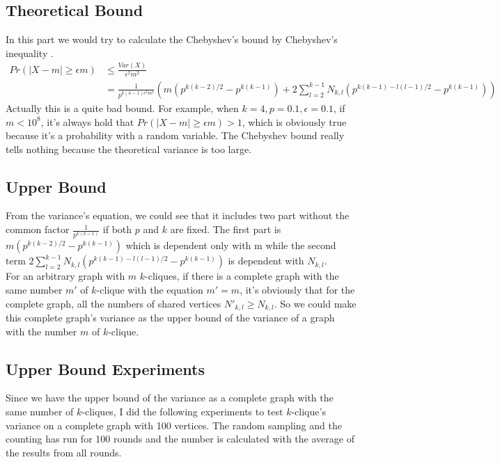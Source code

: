 \subsection{Theoretical Bound}
In this part we would try to calculate the Chebyshev's bound by Chebyshev's inequality\cite{cheby} \cite {cheby_wki}. \\
\[
        \begin{split}
Pr(|X - m| \geq \epsilon m) &\leq \frac{Var(X)}{\epsilon^2 m^2}  \\
&= \frac{1}{p^{k(k-1) \epsilon^2 m^2}}(m(p^{k(k-2)/2} - p^{k(k-1)}) + 2\sum_{l=2}^{k-1} N_{k,l}(p^{k(k-1)-l(l-1)/2} - p^{k(k-1)}))
        \end{split}
\]
Actually this is a quite bad bound. For example, when $k = 4, p=0.1, \epsilon = 0.1$, if $m < 10^8$, it's always hold that $Pr(|X - m| \geq \epsilon m) > 1$, which is obviously true because it's a probability with a random variable. The Chebyshev bound really tells nothing because the theoretical variance is too large.
\subsection{Upper Bound}
From the variance's equation, we could see that it includes two part without the common factor $\frac{1}{p^{k(k-1)}}$ if both $p$ and $k$ are fixed. The first part is $m(p^{k(k-2)/2} - p^{k(k-1)})$ which is dependent only with m while the second term  $2\sum_{l=2}^{k-1} N_{k,l}(p^{k(k-1)-l(l-1)/2} - p^{k(k-1)})$ is dependent with $N_{k,l}$. \\
For an arbitrary graph with $m$ $k$-cliques, if there is a complete graph with the same number $m'$ of $k$-clique with the equation $m' = m$, it's obviously that for the complete graph, all the numbers of shared vertices $N'_{k,l} \geq N_{k,l}$. So we could make this complete graph's variance as the upper bound of the variance of a graph with the number $m$ of $k$-clique.
\subsection{Upper Bound Experiments}
Since we have the upper bound of the variance as a complete graph with the same number of $k$-cliques, I did the following experiments to test $k$-clique's variance on a complete graph with 100 vertices. The random sampling and the counting has run for 100 rounds and the number is calculated with the average of the results from all rounds. \\

